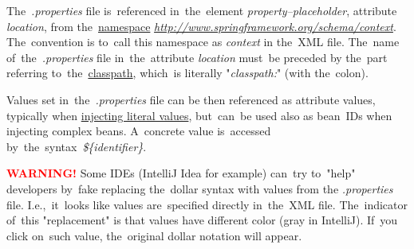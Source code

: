 \documentclass[12pt, dvipsnames, oneside, a4paper, titlepage, usenames]{report}
\newcommand{\highlight}[2]{\vspace{\baselineskip}\noindent\textcolor{#2}{\textbf{#1}}}
\newcommand{\warning}{\highlight{WARNING! }{red}}
\begin{document}
    The~\textit{.properties} file is~referenced in~the~element \textit{property--placeholder}, attribute \textit{location}, from the~\hyperref[namespaces]{namespace} \textit{\href{http://www.springframework.org/schema/context}{http://www.springframework.org/schema/context}}. The~convention is to~call this namespace as \textit{context} in the~XML file. The~name of~the~\textit{.properties} file in~the~attribute \textit{location} must~be preceded by the~part referring to~the~\hyperref[classpath]{classpath}, which~is literally "\textit{classpath:}" (with the~colon).

    Values set in~the~\textit{.properties} file can be then referenced as attribute values, typically when \hyperref[injectingliteralvalues]{injecting literal values}, but~can~be used also as bean~IDs when injecting complex beans. A~concrete value is~accessed by~the~syntax~\textit{\$\{identifier\}}.

    \warning Some IDEs (IntelliJ Idea for example) can~try to~"help" developers by~fake replacing the~dollar syntax with values from the \textit{.properties} file. I.e.,~it~looks like values are~specified directly in~the~XML file. The~indicator of~this "replacement" is that values have different color (gray in IntelliJ). If~you click on~such value, the~original dollar notation will appear.\\
\end{document}
